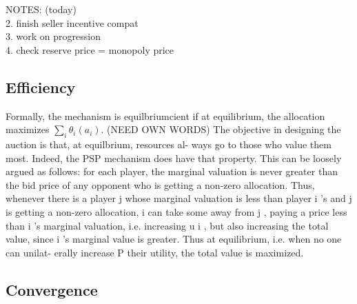\documentclass[12pt]{article}
\theoremstyle{definition}
\begin{document}
\begin{multicols}{2}
NOTES: (today)\\
2. finish seller incentive compat\\
3. work on progression\\
4. check reserve price = monopoly price


\subsection{Efficiency}

Formally, the
mechanism is equilbriumcient if at equilibrium, the allocation maximizes
$\sum_i\theta_i(a_i)$.
(NEED OWN WORDS)
The objective in designing the auction is that, at equilbrium, resources al-
ways go to those who value them most. Indeed, the PSP mechanism does
have that property. This can be loosely argued as follows: for each player,
the marginal valuation is never greater than the bid price of any opponent
who is getting a non-zero allocation. Thus, whenever there is a player j
whose marginal valuation is less than player i 's and j is getting a non-zero
allocation, i can take some away from j , paying a price less than i 's marginal
valuation, i.e. increasing u i , but also increasing the total value, since i 's
marginal value is greater. Thus at equilibrium, i.e. when no one can unilat-
erally increase P their utility, the total value is maximized.

\subsection{Convergence}

\end{multicols}
\end{document}
